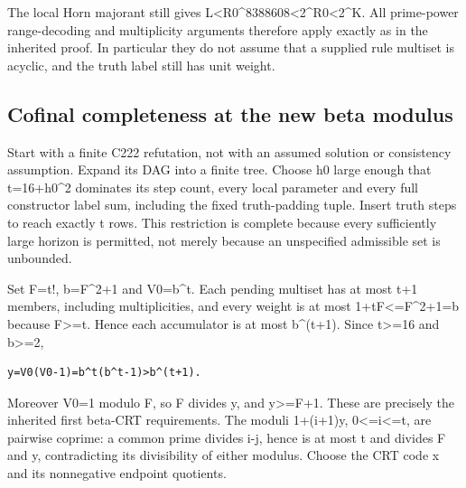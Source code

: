 The local Horn majorant still gives L\textless{}\allowbreak{}R0\textasciicircum{}\allowbreak{}8388608\textless{}\allowbreak{}2\textasciicircum{}\allowbreak{}R0\textless{}\allowbreak{}2\textasciicircum{}\allowbreak{}K. All prime-power range-decoding and multiplicity arguments therefore apply exactly as in the inherited proof. In particular they do not assume that a supplied rule multiset is acyclic, and the truth label still has unit weight.



\subsection{Cofinal completeness at the new beta modulus}



Start with a finite C222 refutation, not with an assumed solution or consistency assumption. Expand its DAG into a finite tree. Choose h0 large enough that t=\allowbreak{}16+\allowbreak{}h0\textasciicircum{}\allowbreak{}2 dominates its step count, every local parameter and every full constructor label sum, including the fixed truth-padding tuple. Insert truth steps to reach exactly t rows. This restriction is complete because every sufficiently large horizon is permitted, not merely because an unspecified admissible set is unbounded.



Set F=\allowbreak{}t!, b=\allowbreak{}F\textasciicircum{}\allowbreak{}2+\allowbreak{}1 and V0=\allowbreak{}b\textasciicircum{}\allowbreak{}t. Each pending multiset has at most t+\allowbreak{}1 members, including multiplicities, and every weight is at most 1+\allowbreak{}tF\textless{}\allowbreak{}=\allowbreak{}F\textasciicircum{}\allowbreak{}2+\allowbreak{}1=\allowbreak{}b because F\textgreater{}\allowbreak{}=\allowbreak{}t. Hence each accumulator is at most b\textasciicircum{}\allowbreak{}(t+\allowbreak{}1). Since t\textgreater{}\allowbreak{}=\allowbreak{}16 and b\textgreater{}\allowbreak{}=\allowbreak{}2,



\begin{verbatim}
y=V0(V0-1)=b^t(b^t-1)>b^(t+1).
\end{verbatim}

Moreover V0=\allowbreak{}1 modulo F, so F divides y, and y\textgreater{}\allowbreak{}=\allowbreak{}F+\allowbreak{}1. These are precisely the inherited first beta-CRT requirements. The moduli 1+\allowbreak{}(i+\allowbreak{}1)y, 0\textless{}\allowbreak{}=\allowbreak{}i\textless{}\allowbreak{}=\allowbreak{}t, are pairwise coprime: a common prime divides i-j, hence is at most t and divides F and y, contradicting its divisibility of either modulus. Choose the CRT code x and its nonnegative endpoint quotients.



